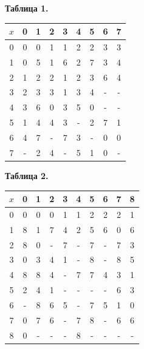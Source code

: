 \documentclass[oneside,final,14pt]{extreport}
\begin{document}
\centerline{\bf Таблица 1.}
\begin{center}
\begin{tabular}{|c|c|c|c|c|c|c|c|c|}
\hline \(x\) & 0 & 1 & 2 & 3 & 4 & 5 & 6 & 7 \\ \hline
0 & 0 & 0 & 1 & 1 & 2 & 2 & 3 & 3 \\ \hline 
1 & 0 & 5 & 1 & 6 & 2 & 7 & 3 & 4 \\ \hline
2 & 1 & 2 & 2 & 1 & 2 & 3 & 6 & 4 \\ \hline
3 & 2 & 3 & 3 & 1 & 3 & 4 & - & - \\ \hline
4 & 3 & 6 & 0 & 3 & 5 & 0 & - & - \\ \hline
5 & 1 & 4 & 4 & 3 & - & 2 & 7 & 1 \\ \hline
6 & 4 & 7 & - & 7 & 3 & - & 0 & 0 \\ \hline
7 & - & 2 & 4 & - & 5 & 1 & 0 & - \\ \hline
\end{tabular}
\end{center}

\centerline{\bf Таблица 2.}
\begin{center}
\begin{tabular}{|c|c|c|c|c|c|c|c|c|c|}
\hline \(x\) & 0 & 1 & 2 & 3 & 4 & 5 & 6 & 7 & 8 \\ \hline
0 & 0 & 0 & 0 & 1 & 1 & 2 & 2 & 2 & 1 \\ \hline 
1 & 8 & 1 & 7 & 4 & 2 & 5 & 6 & 0 & 6 \\ \hline
2 & 8 & 0 & - & 7 & - & 7 & - & 7 & 3 \\ \hline
3 & 0 & 3 & 4 & 1 & - & 8 & - & 8 & 5 \\ \hline
4 & 8 & 8 & 4 & - & 7 & 7 & 4 & 3 & 1 \\ \hline
5 & 2 & 4 & 1 & - & - & - & - & 6 & 3 \\ \hline
6 & - & 8 & 6 & 5 & - & 7 & 5 & 1 & 0 \\ \hline
7 & 0 & 7 & 6 & - & 7 & 8 & - & 6 & 6 \\ \hline
8 & 0 & - & - & - & 8 & - & - & - & - \\ \hline
\end{tabular}
\end{center}
\end{document}
